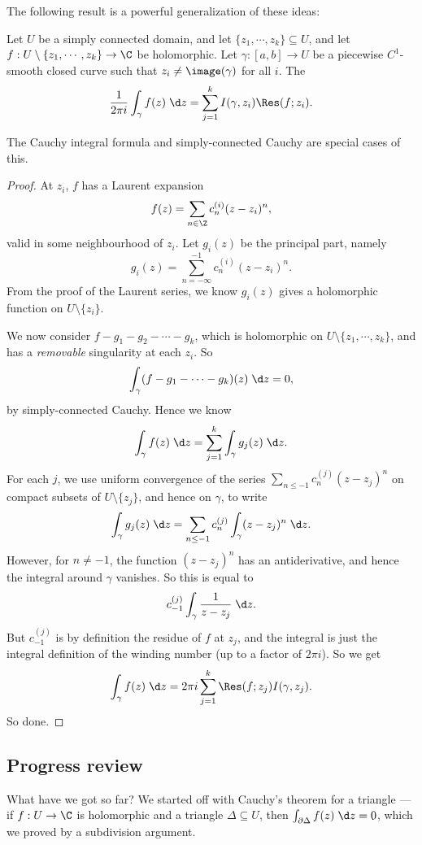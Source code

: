 \documentclass[a4paper]{article}
\begin{document}
The following result is a powerful generalization of these ideas:
\begin{thm}
  Let $U$ be a simply connected domain, and let $\{z_1, \cdots, z_k\} \subseteq U$, and let $f: U \setminus \{z_1, \cdots, z_k\} \to \C$ be holomorphic. Let $\gamma: [a, b] \to U$ be a piecewise $C^1$-smooth closed curve such that $z_i \not= \image(\gamma)$ for all $i$. The
  \[
    \frac{1}{2\pi i} \int_{\gamma}f(z)\;\d z = \sum_{j = 1}^k I(\gamma, z_i) \Res(f; z_i).
  \]
\end{thm}
The Cauchy integral formula and simply-connected Cauchy are special cases of this.

\begin{proof}
  At $z_i$, $f$ has a Laurent expansion
  \[
    f(z) = \sum_{n \in \Z} c_n^{(i)} (z - z_i)^n,
  \]
  valid in some neighbourhood of $z_i$. Let $g_i(z)$ be the principal part, namely
  \[
    g_i(z) = \sum_{n = -\infty}^{-1} c_n^{(i)}(z - z_i)^n.
  \]
  From the proof of the Laurent series, we know $g_i(z)$ gives a holomorphic function on $U \setminus \{z_i\}$.

  We now consider $f - g_1 - g_2 - \cdots - g_k$, which is holomorphic on $U \setminus \{z_1, \cdots, z_k\}$, and has a \emph{removable} singularity at each $z_i$. So
  \[
    \int_\gamma (f - g_1 - \cdots - g_k)(z)\;\d z = 0,
  \]
  by simply-connected Cauchy. Hence we know
  \[
    \int_\gamma f(z)\;\d z = \sum_{j = 1}^k \int_\gamma g_j(z)\;\d z.
  \]
  For each $j$, we use uniform convergence of the series $\sum_{n \leq -1} c_n^{(j)} (z - z_j)^n$ on compact subsets of $U \setminus \{z_j\}$, and hence on $\gamma$, to write
  \[
    \int_\gamma g_j(z)\;\d z = \sum_{n \leq -1} c_n^{(j)} \int_\gamma (z - z_j)^n\;\d z.
  \]
  However, for $n \not= -1$, the function $(z - z_j)^n$ has an antiderivative, and hence the integral around $\gamma$ vanishes. So this is equal to
  \[
    c_{-1}^{(j)} \int_\gamma \frac{1}{z - z_j}\;\d z.
  \]
  But $c_{-1}^{(j)}$ is by definition the residue of $f$ at $z_j$, and the integral is just the integral definition of the winding number (up to a factor of $2\pi i$). So we get
  \[
    \int_\gamma f(z)\;\d z = 2\pi i \sum_{j = 1}^k \Res(f; z_j) I(\gamma, z_j).
  \]
  So done.
\end{proof}

\subsection{Progress review}
What have we got so far? We started off with Cauchy's theorem for a triangle --- if $f: U \to \C$ is holomorphic and a triangle $\Delta \subseteq U$, then $\int_{\partial \Delta} f(z)\;\d z = 0$, which we proved by a subdivision argument.
\end{document}
